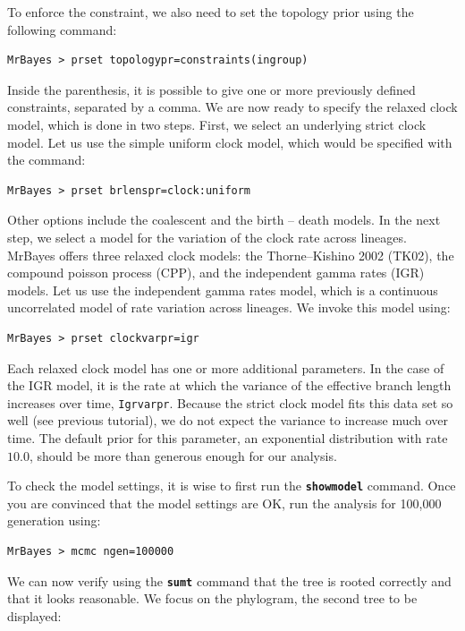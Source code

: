 \documentclass[12pt]{book}
\newcommand{\ttt}[1]{\texttt{#1}}
\newcommand{\tb}[1]{\ttt{\textbf{#1}}}
\begin{document}
To enforce the constraint, we also need to set the topology prior using the following command:

\begin{verbatim}
MrBayes > prset topologypr=constraints(ingroup)
\end{verbatim}

Inside the parenthesis, it is possible to give one or more previously defined constraints,
separated by a comma. We are now ready to specify the relaxed clock model, which is done in two
steps. First, we select an underlying strict clock model. Let us use the simple uniform clock
model, which would be specified with the command:

\begin{verbatim}
MrBayes > prset brlenspr=clock:uniform
\end{verbatim}

Other options include the coalescent and the birth -- death models. In the next step, we select a
model for the variation of the clock rate across lineages. MrBayes offers three relaxed clock
models: the Thorne--Kishino 2002 (TK02), the compound poisson process (CPP), and the independent
gamma rates (IGR) models. Let us use the independent gamma rates model, which is a continuous
uncorrelated model of rate variation across lineages. We invoke this model using:

\begin{verbatim}
MrBayes > prset clockvarpr=igr
\end{verbatim}

Each relaxed clock model has one or more additional parameters. In the case of the IGR model, it is
the rate at which the variance of the effective branch length increases over time, \ttt{Igrvarpr}.
Because the strict clock model fits this data set so well (see previous tutorial), we do not expect
the variance to increase much over time. The default prior for this parameter, an exponential
distribution with rate $10.0$, should be more than generous enough for our analysis.

To check the model settings, it is wise to first run the \tb{showmodel} command. Once you are
convinced that the model settings are OK, run the analysis for 100,000 generation using:

\begin{verbatim}
MrBayes > mcmc ngen=100000
\end{verbatim}

We can now verify using the \tb{sumt} command that the tree is rooted correctly and that it
looks reasonable. We focus on the phylogram, the second tree to be displayed:
\end{document}

